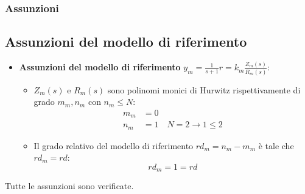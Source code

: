 \documentclass{beamer}
\begin{document}
\begin{frame}
    \frametitle{Assunzioni}%
    \subsection{Assunzioni del modello di riferimento}
    \begin{itemize}
        \item \textbf{Assunzioni del modello di riferimento} \(y_{m}=\frac{1}{s+1}r=k_{m}\frac{Z_{m}(s)}{R_{m}(s)} \):
        \begin{itemize}
            \item \(Z_{m}(s)\text{ e }R_{m}(s)\) sono polinomi monici di Hurwitz rispettivamente di grado \(m_{m},n_{m}\) con \(n_{m}\leq N\):\begin{align}
                m_{m}&=0\\
                n_{m}&=1\quad N=2\rightarrow  1\leq 2
            \end{align}
            \item Il grado relativo del modello di riferimento \(rd_{m}=n_{m}-m_{m}\) è tale che \(rd_{m}=rd\):\begin{equation}
                rd_{m}=1=rd
            \end{equation}
        \end{itemize}
    \end{itemize}
    Tutte le assunzioni sono verificate.
\end{frame}
\end{document}

